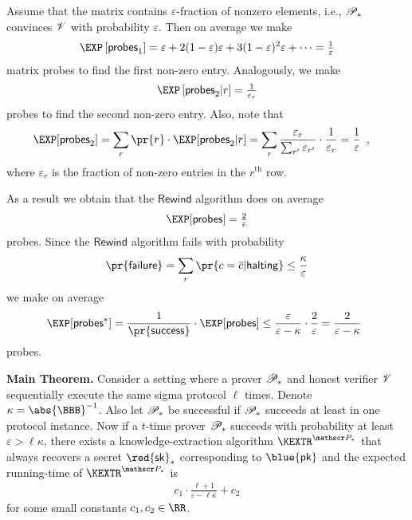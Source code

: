 \documentclass[landscape,footrule]{foils}
\newcommand{\probes}{\mathsf{probes}}
\renewcommand{\SK}{{\red{\mathsf{sk}}}}
\renewcommand{\PK}{{\blue{\mathsf{pk}}}}
\begin{document}

Assume that the matrix contains $\varepsilon$-fraction of nonzero
elements, i.e., $\mathscr{P}_*$ convinces $\mathscr{V}$ with probability
$\varepsilon$. Then on average we make
\begin{align*}
  \E{\probes_1}= \varepsilon +
  2(1-\varepsilon)\varepsilon+3(1-\varepsilon)^2\varepsilon+\cdots=\textstyle \frac{1}{\varepsilon}
\end{align*}
matrix probes to find the first non-zero entry. Analogously, we make 
\begin{align*}
  \E{\probes_2|r}=\textstyle\frac{1}{\varepsilon_r}
\end{align*}
probes to find the second non-zero entry. Also, note that  
\begin{align*}
  \EXP[\probes_2]%
  &=\sum_{r}\pr{r}\cdot \EXP[\probes_2|r]=
  \sum_{r}\frac{\varepsilon_r}{\sum_{r'}\varepsilon_{r'}}\cdot\frac{1}{\varepsilon_r}
  =  \frac{1}{\varepsilon}\enspace,
\end{align*}
where $\varepsilon_r$ is the fraction of non-zero entries in the $r^{\text{th}}$ row.


As a result we obtain that the $\mathsf{Rewind}$ algorithm does on average
\begin{align*}
  \EXP[\probes]=\textstyle \frac{2}{\varepsilon}
\end{align*}
probes. Since the $\mathsf{Rewind}$ algorithm fails with probability
\begin{align*}
  \pr{\mathsf{failure}}=\sum_{r}\pr{c=\overline{c}|\mathsf{halting}}
  \leq\frac{\kappa}{\varepsilon}
\end{align*}
we make on average 
\begin{align*}
  \EXP[\probes^*]=\frac{1}{\pr{\mathsf{success}}}\cdot\EXP[\probes]
  \leq\frac{\varepsilon}{\varepsilon-\kappa}\cdot\frac{2}{\varepsilon}=\frac{2}{\varepsilon-\kappa}\enspace
\end{align*}
probes.


\textbf{Main Theorem.}  Consider a setting where a prover $\mathscr{P}_*$
and honest verifier $\mathscr{V}$ sequentially execute the same sigma
protocol $\ell$ times. Denote $\kappa=\abs{\BBB}^{-1}$. Also let
$\mathscr{P}_*$ be successful if $\mathscr{P}_*$ succeeds at least in one
protocol instance. Now if a $t$-time prover $\mathscr{P}_*$ succeeds with
probability at least $\varepsilon>\ell\kappa$, there exists a
knowledge-extraction algorithm $\KEXTR^{\PROVER_*}$ that always
recovers a secret $\SK_*$ corresponding to $\PK$ and the expected
running-time of $\KEXTR^{\PROVER_*}$ is
\begin{align*}
  c_1\cdot\frac{\ell+1}{\varepsilon-\ell\kappa}+c_2
\end{align*}
for some small constants $ c_1,c_2\in\RR$. 
\bigskip
\end{document}
